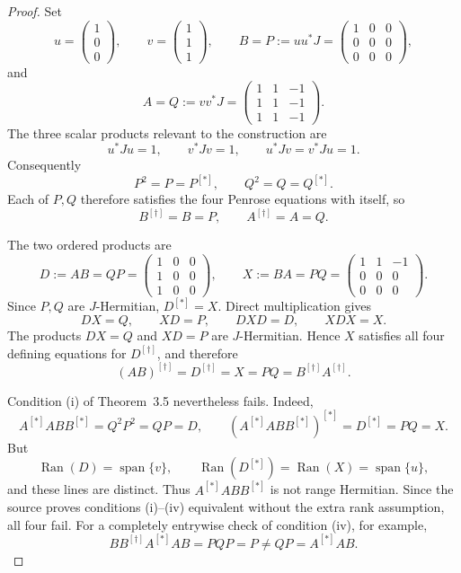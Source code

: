 \documentclass[11pt]{article}
\newcommand{\Ran}{\operatorname{Ran}}
\newcommand{\sh}{^{[*]}}
\newcommand{\jmp}{^{[\dagger]}}
\begin{document}
\begin{proof}
Set
\[
 u=\begin{pmatrix}1\\0\\0\end{pmatrix},\qquad
 v=\begin{pmatrix}1\\1\\1\end{pmatrix},\qquad
 B=P:=u u^*J=\begin{pmatrix}1&0&0\\0&0&0\\0&0&0\end{pmatrix},
\]
and
\[
 A=Q:=v v^*J=
 \begin{pmatrix}
 1&1&-1\\
 1&1&-1\\
 1&1&-1
 \end{pmatrix}.
\]
The three scalar products relevant to the construction are
\[
 u^*Ju=1,\qquad v^*Jv=1,
 \qquad u^*Jv=v^*Ju=1.
\]
Consequently
\[
 P^2=P=P\sh,\qquad Q^2=Q=Q\sh.
\]
Each of \(P,Q\) therefore satisfies the four Penrose equations with itself,
so
\[
 B\jmp=B=P,\qquad A\jmp=A=Q.
\]

The two ordered products are
\[
 D:=AB=QP=
 \begin{pmatrix}1&0&0\\1&0&0\\1&0&0\end{pmatrix},
 \qquad
 X:=BA=PQ=
 \begin{pmatrix}1&1&-1\\0&0&0\\0&0&0\end{pmatrix}.
\]
Since \(P,Q\) are \(J\)-Hermitian, \(D\sh=X\).  Direct multiplication gives
\[
 DX=Q,\qquad XD=P,\qquad DXD=D,\qquad XDX=X.
\]
The products \(DX=Q\) and \(XD=P\) are \(J\)-Hermitian.  Hence \(X\)
satisfies all four defining equations for \(D\jmp\), and therefore
\[
 (AB)\jmp=D\jmp=X=PQ=B\jmp A\jmp.
\]

Condition (i) of Theorem~3.5 nevertheless fails.  Indeed,
\[
 A\sh A B B\sh=Q^2P^2=QP=D,
 \qquad (A\sh A B B\sh)\sh=D\sh=PQ=X.
\]
But
\[
 \Ran(D)=\operatorname{span}\{v\},\qquad
 \Ran(D\sh)=\Ran(X)=\operatorname{span}\{u\},
\]
and these lines are distinct.  Thus \(A\sh A B B\sh\) is not range
Hermitian.  Since the source proves conditions (i)--(iv) equivalent without
the extra rank assumption, all four fail.  For a completely entrywise check
of condition (iv), for example,
\[
 BB\jmp A\sh AB=PQP=P\ne QP=A\sh AB.
\]


\end{proof}
\end{document}
